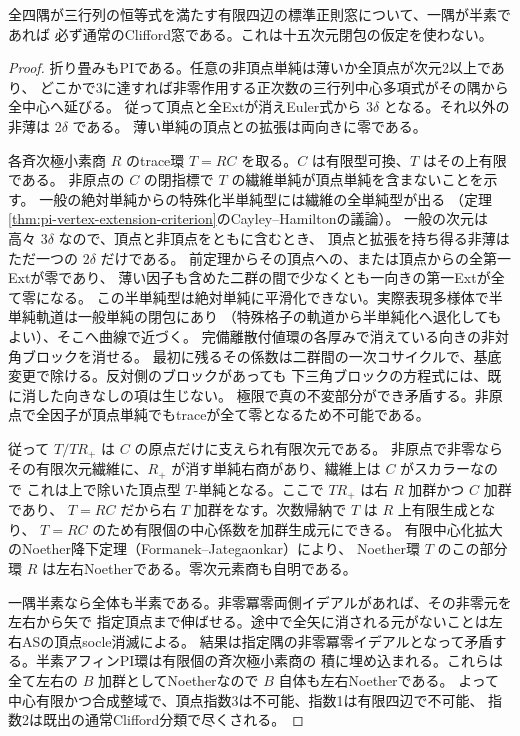 \begin{corollary}\label{cor:semiprime-three-matrix-clifford}
全四隅が三行列の恒等式を満たす有限四辺の標準正則窓について、一隅が半素であれば
必ず通常のClifford窓である。これは十五次元閉包の仮定を使わない。
\end{corollary}
\begin{proof}
折り畳みもPIである。任意の非頂点単純は薄いか全頂点が次元2以上であり、
どこかで3に達すれば非零作用する正次数の三行列中心多項式がその隅から全中心へ延びる。
従って頂点と全Extが消えEuler式から $3\delta$ となる。それ以外の非薄は $2\delta$ である。
薄い単純の頂点との拡張は両向きに零である。

各斉次極小素商 $R$ のtrace環 $T=RC$ を取る。$C$ は有限型可換、$T$ はその上有限である。
非原点の $C$ の閉指標で $T$ の繊維単純が頂点単純を含まないことを示す。
一般の絶対単純からの特殊化半単純型には繊維の全単純型が出る
（定理\ref{thm:pi-vertex-extension-criterion}のCayley--Hamiltonの議論）。
一般の次元は高々 $3\delta$ なので、頂点と非頂点をともに含むとき、
頂点と拡張を持ち得る非薄はただ一つの $2\delta$ だけである。
前定理からその頂点への、または頂点からの全第一Extが零であり、
薄い因子も含めた二群の間で少なくとも一向きの第一Extが全て零になる。
この半単純型は絶対単純に平滑化できない。実際表現多様体で半単純軌道は一般単純の閉包にあり
（特殊格子の軌道から半単純化へ退化してもよい）、そこへ曲線で近づく。
完備離散付値環の各厚みで消えている向きの非対角ブロックを消せる。
最初に残るその係数は二群間の一次コサイクルで、基底変更で除ける。反対側のブロックがあっても
下三角ブロックの方程式には、既に消した向きなしの項は生じない。
極限で真の不変部分ができ矛盾する。非原点で全因子が頂点単純でもtraceが全て零となるため不可能である。

従って $T/T R_+$ は $C$ の原点だけに支えられ有限次元である。
非原点で非零ならその有限次元繊維に、$R_+$ が消す単純右商があり、繊維上は $C$ がスカラーなので
これは上で除いた頂点型 $T$-単純となる。ここで $TR_+$ は右 $R$ 加群かつ $C$ 加群であり、
$T=RC$ だから右 $T$ 加群をなす。次数帰納で $T$ は $R$ 上有限生成となり、
$T=RC$ のため有限個の中心係数を加群生成元にできる。
有限中心化拡大のNoether降下定理（Formanek--Jategaonkar）により、
Noether環 $T$ のこの部分環 $R$ は左右Noetherである。零次元素商も自明である。

一隅半素なら全体も半素である。非零冪零両側イデアルがあれば、その非零元を左右から矢で
指定頂点まで伸ばせる。途中で全矢に消される元がないことは左右ASの頂点socle消滅による。
結果は指定隅の非零冪零イデアルとなって矛盾する。半素アフィンPI環は有限個の斉次極小素商の
積に埋め込まれる。これらは全て左右の $B$ 加群としてNoetherなので $B$ 自体も左右Noetherである。
よって中心有限かつ合成整域で、頂点指数3は不可能、指数1は有限四辺で不可能、
指数2は既出の通常Clifford分類で尽くされる。
\end{proof}

